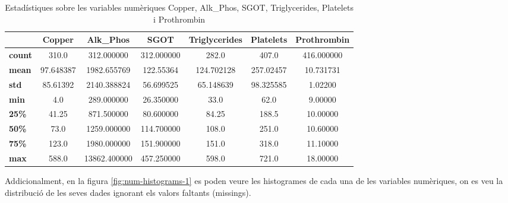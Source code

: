 \begin{table}[H]
\centering
\begin{tabular}{|l|c|c|c|c|c|c|}
\hline
\textbf{} & \textbf{Copper} & \textbf{Alk\_Phos} & \textbf{SGOT} & \textbf{Triglycerides} & \textbf{Platelets} & \textbf{Prothrombin} \\ \hline
\textbf{count}     & 310.0           & 312.000000        & 312.000000    & 282.0                  & 407.0              & 416.000000           \\ \hline
\textbf{mean}      & 97.648387       & 1982.655769       & 122.55364     & 124.702128             & 257.02457          & 10.731731            \\ \hline
\textbf{std}       & 85.61392        & 2140.388824       & 56.699525     & 65.148639              & 98.325585          & 1.02200              \\ \hline
\textbf{min}       & 4.0             & 289.000000        & 26.350000     & 33.0                   & 62.0               & 9.00000              \\ \hline
\textbf{25\%}      & 41.25           & 871.500000        & 80.600000     & 84.25                  & 188.5              & 10.00000             \\ \hline
\textbf{50\%}      & 73.0            & 1259.000000       & 114.700000    & 108.0                  & 251.0              & 10.60000             \\ \hline
\textbf{75\%}      & 123.0           & 1980.000000       & 151.900000    & 151.0                  & 318.0              & 11.10000             \\ \hline
\textbf{max}       & 588.0           & 13862.400000      & 457.250000    & 598.0                  & 721.0              & 18.00000             \\ \hline
\end{tabular}
\caption{Estadístiques sobre les variables numèriques Copper, Alk\_Phos, SGOT, Triglycerides, Platelets i Prothrombin}
\label{tab:num-stats-2}
\end{table}

Addicionalment, en la figura \ref{fig:num-histograms-1} es poden veure les histogrames de cada una de les variables numèriques, on es veu la distribució de les seves dades ignorant els valors faltants (missings).


